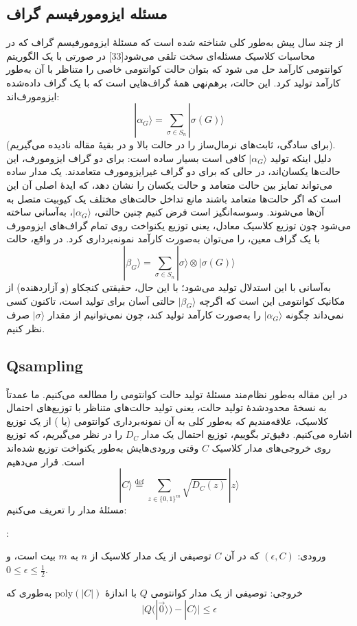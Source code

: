 \subsection*{مسئله ایزومورفیسم گراف}
از چند سال پیش به‌طور کلی شناخته شده است که مسئلهٔ ایزومورفیسم گراف که در محاسبات کلاسیک مسئله‌ای سخت تلقی می‌شود[33]  در صورتی با یک الگوریتم کوانتومی کارآمد حل می شود که بتوان حالت کوانتومی خاصی را متناظر با آن به‌طور کارآمد تولید کرد. این حالت، برهم‌نهی همهٔ گراف‌هایی است که با یک گراف داده‌شده ایزومورف‌اند:
\begin{equation}
	|\alpha_G\rangle = \sum_{\sigma \in S_n} |\sigma(G)\rangle
\end{equation}
(برای سادگی، ثابت‌های نرمال‌ساز را در حالت بالا و در بقیهٔ مقاله نادیده می‌گیریم).
\noindent
دلیل اینکه تولید $|\alpha_G\rangle$ کافی است بسیار ساده است: برای دو گراف ایزومورف، این حالت‌ها یکسان‌اند، در حالی که برای دو گراف غیرایزومورف متعامدند. یک مدار ساده می‌تواند تمایز بین حالت متعامد و حالت یکسان را نشان دهد، که ایدهٔ اصلی آن این است که اگر حالت‌ها متعامد باشند مانع تداخل حالت‌های مختلف یک کیوبیت متصل به آن‌ها می‌شوند. وسوسه‌انگیز است فرض کنیم چنین حالتی، $|\alpha_G\rangle$، به‌آسانی ساخته می‌شود چون توزیع کلاسیک معادل، یعنی توزیع یکنواخت روی تمام گراف‌های ایزومورف با یک گراف معین، را می‌توان به‌صورت کارآمد نمونه‌برداری کرد. در واقع، حالت 
$$|\beta_G\rangle = \sum_{\sigma \in S_n} |\sigma\rangle \otimes |\sigma(G)\rangle$$
به‌آسانی با این استدلال تولید می‌شود؛ با این حال، حقیقتی کنجکاو (و آزاردهنده) از مکانیک کوانتومی این است که اگرچه $|\beta_G\rangle$ حالتی آسان برای تولید است، تاکنون کسی نمی‌داند چگونه $|\alpha_G\rangle$ را به‌صورت کارآمد تولید کند، چون نمی‌توانیم از مقدار $|\sigma\rangle$ صرف نظر کنیم.

\subsection*{Qsampling}
در این مقاله به‌طور نظام‌مند مسئلهٔ تولید حالت کوانتومی را مطالعه می‌کنیم. ما عمدتاً به نسخهٔ محدودشدهٔ تولید حالت، یعنی تولید حالت‌های متناظر با توزیع‌های احتمال کلاسیک، علاقه‌مندیم که به‌طور کلی به آن نمونه‌برداری کوانتومی (یا ) از یک توزیع اشاره می‌کنیم. دقیق‌تر بگوییم، توزیع احتمال یک مدار $D_C$ را در نظر می‌گیریم، که توزیع روی خروجی‌های مدار کلاسیک $C$ وقتی ورودی‌هایش به‌طور یکنواخت توزیع شده‌اند است. قرار می‌دهیم 
$$|C\rangle \stackrel{\mathrm{def}}{=} \sum_{z \in \{0,1\}^m} \sqrt{D_C(z)} \,|z\rangle$$
مسئلهٔ  مدار را تعریف می‌کنیم:
\begin{defn}:
	
ورودی: $(\epsilon, C)$ که در آن $C$ توصیفی از یک مدار کلاسیک از $n$ به $m$ بیت است، و $0 \le \epsilon \le \frac{1}{2}$.

خروجی: توصیفی از یک مدار کوانتومی $Q$ با اندازهٔ $\mathrm{poly}(|C|)$ به‌طوری که 
$$\bigl| Q(|\vec{0}\rangle) - |C\rangle \bigr| \le \epsilon$$
\end{defn}

